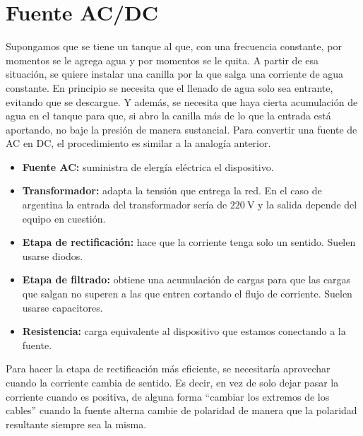 \documentclass[a5paper,12pt,twoside]{book}
\begin{document}
\section{Fuente AC/DC}

Supongamos que se tiene un tanque al que, con una frecuencia constante, por momentos se le agrega agua y por momentos se le quita.
A partir de esa situación, se quiere instalar una canilla por la que salga una corriente de agua constante.
En principio se necesita que el llenado de agua solo sea entrante, evitando que se descargue.
Y además, se necesita que haya cierta acumulación de agua en el tanque para que, si abro la canilla más de lo que la entrada está aportando, no baje la presión de manera sustancial.
Para convertir una fuente de AC en DC, el procedimiento es similar a la analogía anterior.

\begin{itemize}
    \item \textbf{Fuente AC:} suministra de elergía eléctrica el dispositivo.
    \item \textbf{Transformador:} adapta la tensión que entrega la red.
    En el caso de argentina la entrada del transformador sería de $\SI{220}{\volt}$ y la salida depende del equipo en cuestión.
    \item \textbf{Etapa de rectificación:} hace que la corriente tenga solo un sentido.
    Suelen usarse diodos.
    \item \textbf{Etapa de filtrado:} obtiene una acumulación de cargas para que las cargas que salgan no superen a las que entren cortando el flujo de corriente.
    Suelen usarse capacitores.
    \item \textbf{Resistencia:} carga equivalente al dispositivo que estamos conectando a la fuente.
\end{itemize}

\begin{center}
    \def\svgwidth{\linewidth}
    
\end{center}


Para hacer la etapa de rectificación más eficiente, se necesitaría aprovechar cuando la corriente cambia de sentido.
Es decir, en vez de solo dejar pasar la corriente cuando es positiva, de alguna forma ``cambiar los extremos de los cables'' cuando la fuente alterna cambie de polaridad de manera que la polaridad resultante siempre sea la misma.

\begin{center}
    \def\svgwidth{0.6\linewidth}
    
\end{center}
\end{document}
